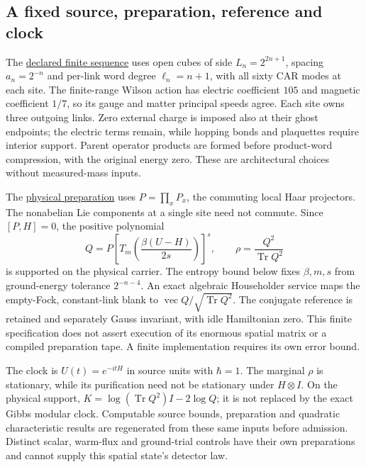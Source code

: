 \subsection{A fixed source, preparation, reference and clock}

The \href{https://github.com/FloatingPragma/observer-patch-holography/blob/main/model/particle_common_contract/PROOF.md}{declared finite sequence}
uses open cubes of side $L_n=2^{2n+1}$, spacing $a_n=2^{-n}$ and
per-link word degree $\ell_n=n+1$, with all sixty CAR modes at each site.
The finite-range Wilson action has electric coefficient $105$ and
magnetic coefficient $1/7$, so its gauge and matter principal speeds agree.
Each site owns three outgoing links. Zero external charge is imposed also
at their ghost endpoints; the electric terms remain, while hopping bonds
and plaquettes require interior support. Parent operator products are
formed before product-word compression, with the original energy zero.
These are architectural choices without measured-mass inputs.

The \href{https://github.com/FloatingPragma/observer-patch-holography/blob/main/model/particle_gauss_ground_state/PROOF.md}{physical preparation}
uses $P=\prod_xP_x$, the commuting local Haar projectors. The nonabelian
Lie components at a single site need not commute. Since $[P,H]=0$, the
positive polynomial
\[
 Q=P\left[T_m\!\left(\frac{\beta(U-H)}{2s}\right)\right]^s,
 \qquad \rho=\frac{Q^2}{\operatorname{Tr}Q^2}
\]
is supported on the physical carrier. The entropy bound below fixes
$\beta,m,s$ from ground-energy tolerance $2^{-n-4}$. An exact algebraic
Householder service maps the empty-Fock, constant-link blank to
$\operatorname{vec}Q/\sqrt{\operatorname{Tr}Q^2}$. The conjugate reference
is retained and separately Gauss invariant, with idle Hamiltonian zero.
This finite specification does not assert execution of its enormous
spatial matrix or a compiled preparation tape. A finite implementation
requires its own error bound.

The clock is $U(t)=e^{-itH}$ in source units with $\hbar=1$. The marginal
$\rho$ is stationary, while its purification need not be stationary under
$H\otimes I$. On the physical support,
$K=\log(\operatorname{Tr}Q^2)I-2\log Q$; it is not replaced by the exact
Gibbs modular clock. Computable source bounds, preparation and quadratic
characteristic results are regenerated from these same inputs before
admission. Distinct scalar, warm-flux and ground-trial controls have their
own preparations and cannot supply this spatial state's detector law.

